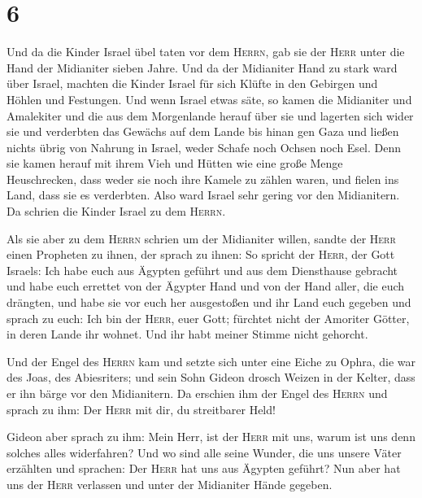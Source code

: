 \hypertarget{section-5}{%
\section{6}\label{section-5}}

 Und da die Kinder Israel übel taten vor dem
\textsc{Herrn}, gab sie der \textsc{Herr} unter die Hand der Midianiter
sieben Jahre.  Und da der Midianiter Hand zu stark ward
über Israel, machten die Kinder Israel für sich Klüfte in den Gebirgen
und Höhlen und Festungen.  Und wenn Israel etwas säte, so
kamen die Midianiter und Amalekiter und die aus dem Morgenlande herauf
über sie  und lagerten sich wider sie und verderbten das
Gewächs auf dem Lande bis hinan gen Gaza und ließen nichts übrig von
Nahrung in Israel, weder Schafe noch Ochsen noch Esel. 
Denn sie kamen herauf mit ihrem Vieh und Hütten wie eine große Menge
Heuschrecken, dass weder sie noch ihre Kamele zu zählen waren, und
fielen ins Land, dass sie es verderbten.  Also ward Israel
sehr gering vor den Midianitern. Da schrien die Kinder Israel zu dem
\textsc{Herrn}.

 Als sie aber zu dem \textsc{Herrn} schrien um der
Midianiter willen,  sandte der \textsc{Herr} einen
Propheten zu ihnen, der sprach zu ihnen: So spricht der \textsc{Herr},
der Gott Israels: Ich habe euch aus Ägypten geführt und aus dem
Diensthause gebracht  und habe euch errettet von der
Ägypter Hand und von der Hand aller, die euch drängten, und habe sie vor
euch her ausgestoßen und ihr Land euch gegeben  und
sprach zu euch: Ich bin der \textsc{Herr}, euer Gott; fürchtet nicht der
Amoriter Götter, in deren Lande ihr wohnet. Und ihr habt meiner Stimme
nicht gehorcht.

 Und der Engel des \textsc{Herrn} kam und setzte sich
unter eine Eiche zu Ophra, die war des Joas, des Abiesriters; und sein
Sohn Gideon drosch Weizen in der Kelter, dass er ihn bärge vor den
Midianitern.  Da erschien ihm der Engel des
\textsc{Herrn} und sprach zu ihm: Der \textsc{Herr} mit dir, du
streitbarer Held!

 Gideon aber sprach zu ihm: Mein Herr, ist der
\textsc{Herr} mit uns, warum ist uns denn solches alles widerfahren? Und
wo sind alle seine Wunder, die uns unsere Väter erzählten und sprachen:
Der \textsc{Herr} hat uns aus Ägypten geführt? Nun aber hat uns der
\textsc{Herr} verlassen und unter der Midianiter Hände gegeben.

